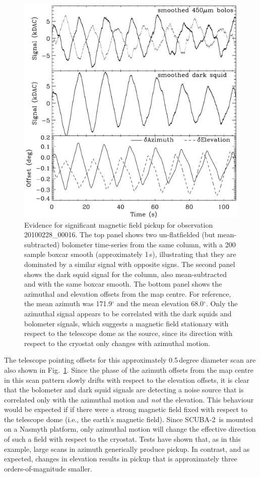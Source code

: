 \documentclass[useAMS,usenatbib,nofootinbib]{mn2e}
\newcommand{\scuba}{SCUBA-2}
\begin{document}
\begin{figure}
\centering
\includegraphics[width=\linewidth]{magpickup.pdf}
\caption{Evidence for significant magnetic field pickup for
  observation 20100228\_00016.  The top panel shows two un-flatfielded
  (but mean-subtracted) bolometer time-series from the same column,
  with a 200 sample boxcar smooth (approximately 1\,s), illustrating
  that they are dominated by a similar signal with opposite signs. The
  second panel shows the dark squid signal for the column, also
  mean-subtracted and with the same boxcar smooth. The bottom panel
  shows the azimuthal and elevation offsets from the map centre. For
  reference, the mean azimuth was 171.9$^\circ$ and the mean elevation
  68.0$^\circ$. Only the azimuthal signal appears to be correlated
  with the dark squids and bolometer signals, which suggests a
  magnetic field stationary with respect to the telescope dome as the
  source, since its direction with respect to the cryostat only
  changes with azimuthal motion.}
\label{fig:magpickup}
\end{figure}

The telescope pointing offsets for this approximately 0.5\,degree
diameter scan are also shown in Fig.~\ref{fig:magpickup}. Since the
phase of the azimuth offsets from the map centre in this scan pattern
slowly drifts with respect to the elevation offsets, it is clear that
the bolometer and dark squid signals are detecting a noise source that
is correlated only with the azimuthal motion and \emph{not} the
elevation. This behaviour would be expected if if there were a strong
magnetic field fixed with respect to the telescope dome (i.e., the
earth's magnetic field). Since \scuba\ is mounted on a Nasmyth
platform, only azimuthal motion will change the effective direction of
such a field with respect to the cryostat. Tests have shown that, as
in this example, large scans in azimuth generically produce pickup. In
contrast, and as expected, changes in elevation results in pickup that
is approximately three orders-of-magnitude smaller.
\end{document}
